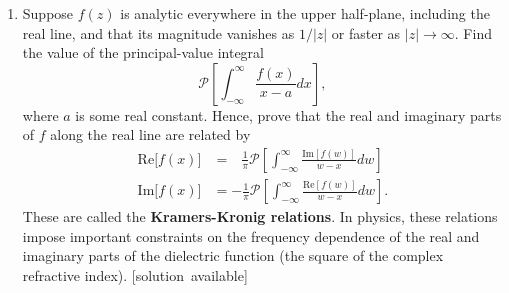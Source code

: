 \documentclass[10pt,a4paper]{article}
\begin{document}
\begin{enumerate}
\item
    Suppose \(f(z)\) is analytic everywhere in the upper half-plane,
  including the real line, and that its magnitude vanishes as \(1/|z|\)
  or faster as \(|z| \rightarrow \infty\). Find the value of the
  principal-value integral
  \begin{equation}
    \mathcal{P}\left[\int_{-\infty}^\infty \frac{f(x)}{x-a} dx \right],
  \end{equation}
  where \(a\) is some real constant. Hence, prove that the real and
  imaginary parts of \(f\) along the real line are related by
  \begin{align}
    \mathrm{Re}\big[f(x)\big]
    &= \;\;\,\frac{1}{\pi} \mathcal{P}\left[\int_{-\infty}^\infty
      \frac{\mathrm{Im}[f(w)]}{w-x} dw\right]
    \\ \mathrm{Im}\big[f(x)\big]
    &= -\frac{1}{\pi} \mathcal{P}\left[\int_{-\infty}^\infty
      \frac{\mathrm{Re}[f(w)]}{w-x} dw\right].
  \end{align}
  These are called the \textbf{Kramers-Kronig relations}. In physics,
  these relations impose important constraints on the frequency
  dependence of the real and imaginary parts of the dielectric
  function (the square of the complex refractive index).
  \vskip -0.05in
  \hfill{\scriptsize [solution~available]}
\end{enumerate}
\end{document}
